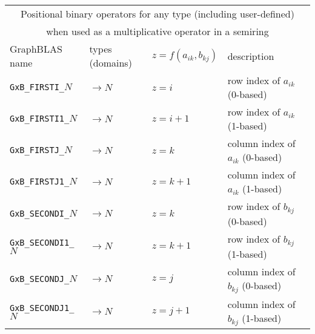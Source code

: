 \documentclass[12pt]{article}
\begin{document}
{\vspace{0.2in}
{\footnotesize
\begin{tabular}{|llll|}
\hline
\multicolumn{4}{|c|}{Positional binary operators for any type (including user-defined)} \\
\multicolumn{4}{|c|}{when used as a multiplicative operator in a semiring} \\
\hline
GraphBLAS name            & types (domains)   & $z=f(a_{ik},b_{kj})$      & description \\
\hline
\verb'GxB_FIRSTI_'$N$    & $ \rightarrow N$  & $z = i$       & row index of $a_{ik}$ (0-based) \\
\verb'GxB_FIRSTI1_'$N$   & $ \rightarrow N$  & $z = i+1$     & row index of $a_{ik}$ (1-based) \\
\verb'GxB_FIRSTJ_'$N$    & $ \rightarrow N$  & $z = k$       & column index of $a_{ik}$ (0-based) \\
\verb'GxB_FIRSTJ1_'$N$   & $ \rightarrow N$  & $z = k+1$     & column index of $a_{ik}$ (1-based) \\
\verb'GxB_SECONDI_'$N$   & $ \rightarrow N$  & $z = k$       & row index of $b_{kj}$ (0-based) \\
\verb'GxB_SECONDI1_'$N$  & $ \rightarrow N$  & $z = k+1$     & row index of $b_{kj}$ (1-based) \\
\verb'GxB_SECONDJ_'$N$   & $ \rightarrow N$  & $z = j$       & column index of $b_{kj}$ (0-based) \\
\verb'GxB_SECONDJ1_'$N$  & $ \rightarrow N$  & $z = j+1$     & column index of $b_{kj}$ (1-based) \\
\hline
\end{tabular}
}

}
\end{document}
